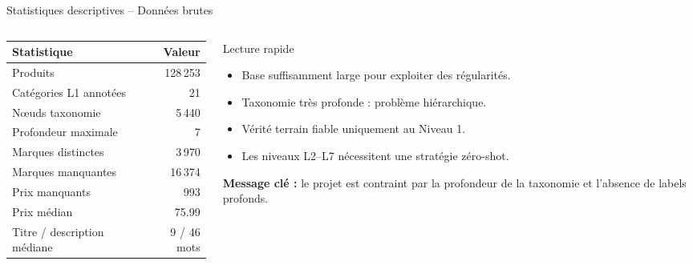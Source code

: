\documentclass[11pt,aspectratio=169]{beamer}
\begin{document}
\begin{frame}{Statistiques descriptives -- Données brutes}
\small
\begin{columns}
\begin{column}{0.48\textwidth}
\begin{table}
\centering
\renewcommand{\arraystretch}{1.15}
\begin{tabular}{lr}
\toprule
\textbf{Statistique} & \textbf{Valeur} \\
\midrule
Produits & 128\,253 \\
Catégories L1 annotées & 21 \\
Nœuds taxonomie & 5\,440 \\
Profondeur maximale & 7 \\
Marques distinctes & 3\,970 \\
Marques manquantes & 16\,374 \\
Prix manquants & 993 \\
Prix médian & 75.99 \\
Titre / description médiane & 9 / 46 mots \\
\bottomrule
\end{tabular}
\end{table}
\end{column}

\begin{column}{0.48\textwidth}
\begin{block}{Lecture rapide}
\begin{itemize}
    \item Base suffisamment large pour exploiter des régularités.
    \item Taxonomie très profonde : problème hiérarchique.
    \item Vérité terrain fiable uniquement au Niveau 1.
    \item Les niveaux L2--L7 nécessitent une stratégie zéro-shot.
\end{itemize}
\end{block}

\vspace{0.2cm}

\begin{takeawaybox}
\centering
\textbf{Message clé :} le projet est contraint par la profondeur de la taxonomie et l'absence de labels profonds.
\end{takeawaybox}
\end{column}
\end{columns}
\end{frame}
\end{document}
